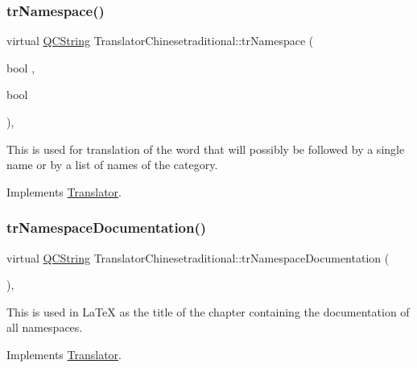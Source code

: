 \subsubsection{\texorpdfstring{trNamespace()}{trNamespace()}}
{\footnotesize\ttfamily virtual \mbox{\hyperlink{class_q_c_string}{Q\+C\+String}} Translator\+Chinesetraditional\+::tr\+Namespace (\begin{DoxyParamCaption}\item[{bool}]{,  }\item[{bool}]{ }\end{DoxyParamCaption})\hspace{0.3cm}{\ttfamily [inline]}, {\ttfamily [virtual]}}

This is used for translation of the word that will possibly be followed by a single name or by a list of names of the category. 

Implements \mbox{\hyperlink{class_translator}{Translator}}.

\mbox{\label{class_translator_chinesetraditional_a8921d97e025593ea1bf75e5154f184e8}} 
\subsubsection{\texorpdfstring{trNamespaceDocumentation()}{trNamespaceDocumentation()}}
{\footnotesize\ttfamily virtual \mbox{\hyperlink{class_q_c_string}{Q\+C\+String}} Translator\+Chinesetraditional\+::tr\+Namespace\+Documentation (\begin{DoxyParamCaption}{ }\end{DoxyParamCaption})\hspace{0.3cm}{\ttfamily [inline]}, {\ttfamily [virtual]}}

This is used in La\+TeX as the title of the chapter containing the documentation of all namespaces. 

Implements \mbox{\hyperlink{class_translator}{Translator}}.

\mbox{\label{class_translator_chinesetraditional_a29d1791d96691ceb1290847ff865ca83}} 
